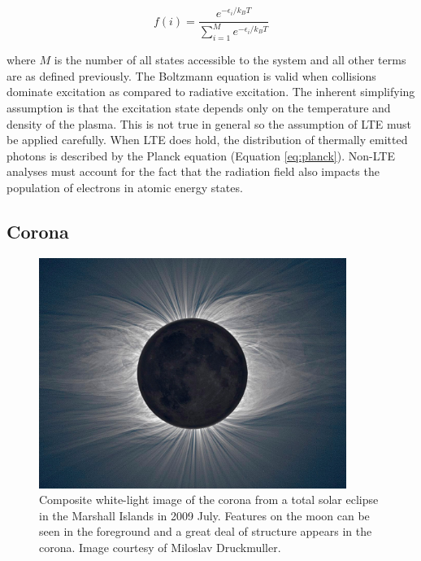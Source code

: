 \begin{equation}
    \label{eq:boltzmann}
    f(i) = \frac{e^{-\epsilon_i / k_BT}}{\sum_{i=1}^M e^{-\epsilon_i / k_BT} }
\end{equation}

\noindent where $M$ is the number of all states accessible to the system and all other terms are as defined previously. The Boltzmann equation is valid when collisions dominate excitation as compared to radiative excitation. The inherent simplifying assumption is that the excitation state depends only on the temperature and density of the plasma. This is not true in general so the assumption of LTE must be applied carefully. When LTE does hold, the distribution of thermally emitted photons is described by the Planck equation (Equation \ref{eq:planck}). Non-LTE analyses must account for the fact that the radiation field also impacts the population of electrons in atomic energy states. 

\subsection{Corona}

\begin{figure}[!h]
    \begin{center}
	    \includegraphics[width=100mm]{Images/CoronaWhiteLight.png}
    \end{center}
    \caption[Corona in white light]{
        Composite white-light image of the corona from a total solar eclipse in the Marshall Islands in 2009 July. 
        Features on the moon can be seen in the foreground and a great deal of structure appears in the corona. 
        Image courtesy of Miloslav Druckmuller. 
    }
    \label{fig:coronawhitelight}
\end{figure}

